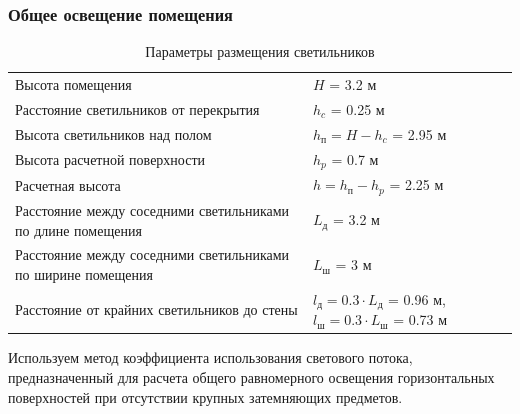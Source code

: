 \subsubsection{Общее освещение помещения}

\begin{table}[ht]
    \centering
    \begin{tabu}{X[l,m]|X[l,m]}
        \hline
        Высота помещения                                                        & $H$ = 3.2 м                                   \\
        Расстояние светильников от перекрытия                                   & $h_c$ = 0.25 м                                \\
        Высота светильников над полом                                           & $h_\text{п} = H - h_c$ = 2.95 м               \\
        Высота расчетной поверхности                                            & $h_p$ = 0.7 м                                 \\
        Расчетная высота                                                        & $h = h_\text{п} - h_p$ = 2.25 м               \\
        Расстояние между соседними светильниками по длине помещения             & $L_\text{д}$ = 3.2 м                          \\
        Расстояние между соседними светильниками по ширине помещения            & $L_\text{ш}$ = 3 м                            \\
        Расстояние от крайних светильников до стены                             & $l_\text{д} = 0.3 \cdot L_\text{д}$ = 0.96 м, \newline
                                                                                  $l_\text{ш} = 0.3 \cdot L_\text{ш}$ = 0.73 м  \\
        \hline
    \end{tabu}
    \caption{Параметры размещения светильников}
    \label{lamps_arrangement_parameters}
\end{table}

Используем метод коэффициента использования светового потока, предназначенный для
расчета общего равномерного освещения горизонтальных поверхностей при отсутствии
крупных затемняющих предметов.

